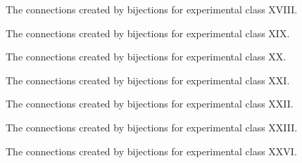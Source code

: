 \begin{figure}[ht!]
    \centering
    
    \caption{The connections created by bijections for experimental class XVIII.}
    \label{fig:expgrp_XVIII}
\end{figure}


\begin{figure}[ht!]
    \centering
    
    \caption{The connections created by bijections for experimental class XIX.}
    \label{fig:expgrp_XIX}
\end{figure}


\begin{figure}[ht!]
    \centering
    
    \caption{The connections created by bijections for experimental class XX.}
    \label{fig:expgrp_XX}
\end{figure}


\begin{figure}[ht!]
    \centering
    
    \caption{The connections created by bijections for experimental class XXI.}
    \label{fig:expgrp_XXI}
\end{figure}


\begin{figure}[ht!]
    \centering
    
    \caption{The connections created by bijections for experimental class XXII.}
    \label{fig:expgrp_XXII}
\end{figure}


\begin{figure}[ht!]
    \centering
    
    \caption{The connections created by bijections for experimental class XXIII.}
    \label{fig:expgrp_XXIII}
\end{figure}


\begin{comment}
\begin{figure}[ht!]
    \centering
    
    \caption{The connections created by bijections for experimental class XXIV.}
    \label{fig:expgrp_XXIV}
\end{figure}
\end{comment}


\begin{comment}
\begin{figure}[ht!]
    \centering
    
    \caption{The connections created by bijections for experimental class XXV.}
    \label{fig:expgrp_XXV}
\end{figure}
\end{comment}


\begin{figure}[ht!]
    \centering
    
    \caption{The connections created by bijections for experimental class XXVI.}
    \label{fig:expgrp_XXVI}
\end{figure}

